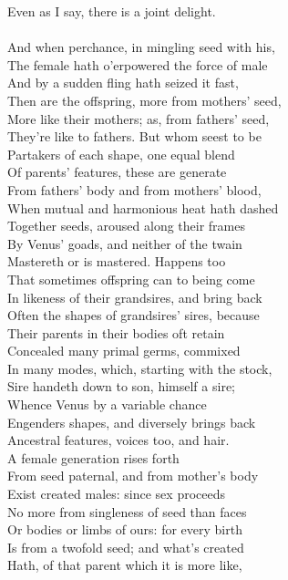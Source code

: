 Even as I say, there is a joint delight.\\
\\
And when perchance, in mingling seed with his,\\
The female hath o'erpowered the force of male\\
And by a sudden fling hath seized it fast,\\
Then are the offspring, more from mothers' seed,\\
More like their mothers; as, from fathers' seed,\\
They're like to fathers. But whom seest to be\\
Partakers of each shape, one equal blend\\
Of parents' features, these are generate\\
From fathers' body and from mothers' blood,\\
When mutual and harmonious heat hath dashed\\
Together seeds, aroused along their frames\\
By Venus' goads, and neither of the twain\\
Mastereth or is mastered. Happens too\\
That sometimes offspring can to being come\\
In likeness of their grandsires, and bring back\\
Often the shapes of grandsires' sires, because\\
Their parents in their bodies oft retain\\
Concealed many primal germs, commixed\\
In many modes, which, starting with the stock,\\
Sire handeth down to son, himself a sire;\\
Whence Venus by a variable chance\\
Engenders shapes, and diversely brings back\\
Ancestral features, voices too, and hair.\\
A female generation rises forth\\
From seed paternal, and from mother's body\\
Exist created males: since sex proceeds\\
No more from singleness of seed than faces\\
Or bodies or limbs of ours: for every birth\\
Is from a twofold seed; and what's created\\
Hath, of that parent which it is more like,\\
